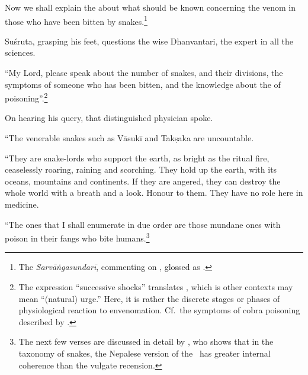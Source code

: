 \begin{translation}
    \item[1] Now we shall explain the  about what should be 
    known concerning the venom in those who have been bitten by
snakes.\footnote{The \emph{Sarvāṅgasundarī}, commenting on
    , glossed  as .}
    
    \item[3] Suśruta, grasping his feet, questions the wise Dhanvantari, the 
    expert in all the sciences.
    
    \item[4]
    
    “My Lord, please speak about the number of snakes, and their divisions,
the symptoms of someone who has been bitten, and the knowledge
about the  of poisoning”.\footnote{The
    expression “successive shocks” translates , which is other
    contexts may mean “(natural) urge.”  Here, it is rather the discrete
    stages or phases of physiological reaction to envenomation.  Cf.\ the
    symptoms of cobra poisoning described by \citet[80]{wall-1913}.}
        
    \item[5]
    
    On hearing his query, that distinguished physician spoke.
    
    “The venerable snakes such as Vāsukī and Takṣaka are uncountable. 
    
\item[6--9ab]

“They are snake-lords who support the earth, as bright as the ritual fire,
ceaselessly roaring, raining and scorching. They hold up the earth, with its
oceans, mountains and continents. If they are angered, they can destroy the
whole world with a breath and a look.  Honour to them. They have no role
here in medicine.

“The ones that I shall enumerate in due order are those mundane
ones with poison in their fangs who bite humans.\footnote{The next few
    verses are discussed in detail by \citet[101--104]{hari-2011}, who shows
    that in the taxonomy of snakes, the Nepalese version of the \SS\ has greater
    internal coherence than the vulgate recension.}


\end{translation}

